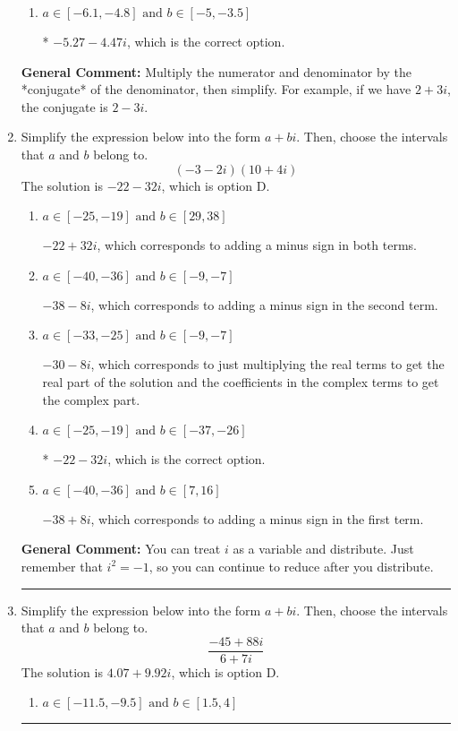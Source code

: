 \documentclass{extbook}[14pt]
\newcommand{\litem}[1]{\item #1

\rule{\textwidth}{0.4pt}}
\begin{document}
\begin{enumerate}
{\begin{enumerate}[label=\Alph*.]
 $-6.73  + 1.53 i$, which corresponds to forgetting to multiply the conjugate by the numerator and not computing the conjugate correctly.
\item \( a \in [-6.1, -4.8] \text{ and } b \in [-5, -3.5] \)

* $-5.27  - 4.47 i$, which is the correct option.
\end{enumerate}

\textbf{General Comment:} Multiply the numerator and denominator by the *conjugate* of the denominator, then simplify. For example, if we have $2+3i$, the conjugate is $2-3i$.
}
\litem{
Simplify the expression below into the form $a+bi$. Then, choose the intervals that $a$ and $b$ belong to.
\[ (-3 - 2 i)(10 + 4 i) \]The solution is \( -22 - 32 i \), which is option D.\begin{enumerate}[label=\Alph*.]
\item \( a \in [-25, -19] \text{ and } b \in [29, 38] \)

 $-22 + 32 i$, which corresponds to adding a minus sign in both terms.
\item \( a \in [-40, -36] \text{ and } b \in [-9, -7] \)

 $-38 - 8 i$, which corresponds to adding a minus sign in the second term.
\item \( a \in [-33, -25] \text{ and } b \in [-9, -7] \)

 $-30 - 8 i$, which corresponds to just multiplying the real terms to get the real part of the solution and the coefficients in the complex terms to get the complex part.
\item \( a \in [-25, -19] \text{ and } b \in [-37, -26] \)

* $-22 - 32 i$, which is the correct option.
\item \( a \in [-40, -36] \text{ and } b \in [7, 16] \)

 $-38 + 8 i$, which corresponds to adding a minus sign in the first term.
\end{enumerate}

\textbf{General Comment:} You can treat $i$ as a variable and distribute. Just remember that $i^2=-1$, so you can continue to reduce after you distribute.
}
\litem{
Simplify the expression below into the form $a+bi$. Then, choose the intervals that $a$ and $b$ belong to.
\[ \frac{-45 + 88 i}{6 + 7 i} \]The solution is \( 4.07  + 9.92 i \), which is option D.\begin{enumerate}[label=\Alph*.]
\item \( a \in [-11.5, -9.5] \text{ and } b \in [1.5, 4] \)


\end{enumerate}}
\end{enumerate}
\end{document}
